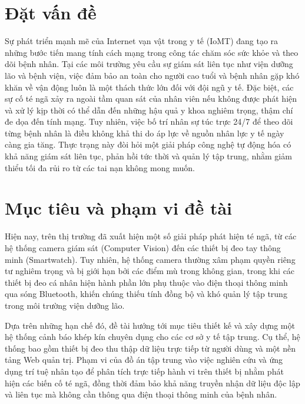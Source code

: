 \documentclass[../DoAn.tex]{subfiles}
\begin{document}
\section{Đặt vấn đề}
\label{section:1.1}
Sự phát triển mạnh mẽ của Internet vạn vật trong y tế (IoMT) đang tạo ra những bước tiến mang tính cách mạng trong công tác chăm sóc sức khỏe và theo dõi bệnh nhân. Tại các môi trường yêu cầu sự giám sát liên tục như viện dưỡng lão và bệnh viện, việc đảm bảo an toàn cho người cao tuổi và bệnh nhân gặp khó khăn về vận động luôn là một thách thức lớn đối với đội ngũ y tế. Đặc biệt, các sự cố té ngã xảy ra ngoài tầm quan sát của nhân viên nếu không được phát hiện và xử lý kịp thời có thể dẫn đến những hậu quả y khoa nghiêm trọng, thậm chí đe dọa đến tính mạng. Tuy nhiên, việc bố trí nhân sự túc trực 24/7 để theo dõi từng bệnh nhân là điều không khả thi do áp lực về nguồn nhân lực y tế ngày càng gia tăng. Thực trạng này đòi hỏi một giải pháp công nghệ tự động hóa có khả năng giám sát liên tục, phản hồi tức thời và quản lý tập trung, nhằm giảm thiểu tối đa rủi ro từ các tai nạn không mong muốn.

\section{Mục tiêu và phạm vi đề tài}
\label{section:1.2}
Hiện nay, trên thị trường đã xuất hiện một số giải pháp phát hiện té ngã, từ các hệ thống camera giám sát (Computer Vision) đến các thiết bị đeo tay thông minh (Smartwatch). Tuy nhiên, hệ thống camera thường xâm phạm quyền riêng tư nghiêm trọng và bị giới hạn bởi các điểm mù trong không gian, trong khi các thiết bị đeo cá nhân hiện hành phần lớn phụ thuộc vào điện thoại thông minh qua sóng Bluetooth, khiến chúng thiếu tính đồng bộ và khó quản lý tập trung trong môi trường viện dưỡng lão.

Dựa trên những hạn chế đó, đề tài hướng tới mục tiêu thiết kế và xây dựng một hệ thống cảnh báo khép kín chuyên dụng cho các cơ sở y tế tập trung. Cụ thể, hệ thống bao gồm thiết bị đeo thu thập dữ liệu trực tiếp từ người dùng và một nền tảng Web quản trị. Phạm vi của đồ án tập trung vào việc nghiên cứu và ứng dụng trí tuệ nhân tạo để phân tích trực tiếp hành vi trên thiết bị nhằm phát hiện các biến cố té ngã, đồng thời đảm bảo khả năng truyền nhận dữ liệu độc lập và liên tục mà không cần thông qua điện thoại thông minh của bệnh nhân.
\end{document}

